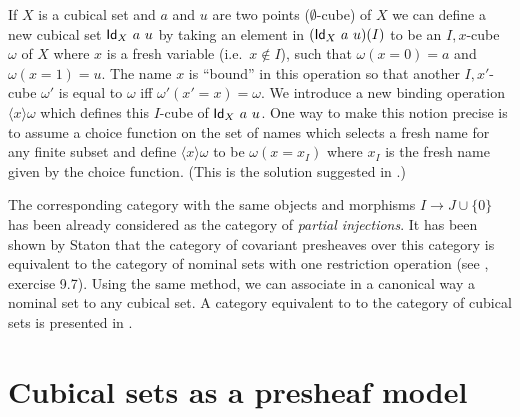 \documentclass[10pt,a4paper]{article}
\newcommand{\Id}{{\sf Id}}
\newcommand{\set}[1]{\{#1\}}
\newcommand{\es}{\emptyset}
\newcommand{\bind}[2]{{\langle}#1{\rangle}#2}
\begin{document}
 If $X$ is a cubical set and $a$ and $u$ are two points ($\es$-cube) of $X$ we can define a new cubical set $\Id_X~a~u$
by taking an element in $(\Id_X~a~u)(I)$ to be an $I,x$-cube $\omega$ of $X$ where $x$ is
a fresh variable (i.e.\ $x \notin I$), such that $\omega(x=0) = a$ and $\omega(x=1) = u$. The name $x$ is ``bound''
in this operation so that another $I,x'$-cube $\omega'$ is equal to $\omega$
if{f} $\omega'(x'=x) = \omega$.
We introduce a new binding operation $\bind{x}{\omega}$ which defines this $I$-cube of $\Id_X~a~u$.
One way to make this notion precise is to assume a choice function
on the set of names which selects a fresh name for any finite subset and define $\bind{x}{\omega}$ to be $\omega (x=x_I)$ where
$x_I$ is the fresh name given by the choice function. (This is the solution suggested in \cite{Stoughton}.)

\medskip

 The corresponding category with the same objects and morphisms $I \to J\cup\{0\}$ has been already
considered as the category of {\em partial injections}. It has been shown by Staton that the category of covariant
presheaves over this category is equivalent to the category of nominal sets with one restriction operation
(see \cite{pitts}, exercise 9.7). Using the same method, we can associate in a canonical way a nominal set
to any cubical set. A category equivalent to to the category of cubical sets is presented in \cite{Pitts}.

\section{Cubical sets as a presheaf model}
\label{sec:presheaf-models}
\end{document}
